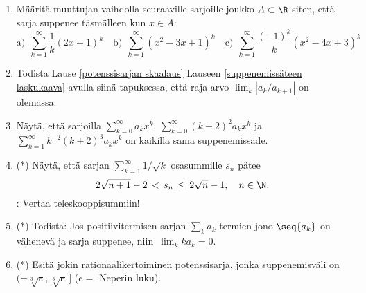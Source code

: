 \begin{enumerate}
\item
Määritä muuttujan vaihdolla seuraaville sarjoille joukko $A\subset\R$ siten, että sarja 
suppenee täsmälleen kun $x \in A$:
\[
\text{a)}\ \ \sum_{k=1}^\infty \frac{1}{k} (2x+1)^k \quad
\text{b)}\ \ \sum_{k=1}^\infty (x^2-3x+1)^k \quad 
\text{c)}\ \ \sum_{k=1}^\infty \frac{(-1)^k}{k}(x^2-4x+3)^k
\]

\item
Todista Lause \ref{potenssisarjan skaalaus} Lauseen \ref{suppenemissäteen laskukaava} avulla
siinä tapuksessa, että raja-arvo $\lim_k |a_k/a_{k+1}|$ on olemassa.

\item
Näytä, että sarjoilla $\sum_{k=0}^\infty a_k x^k$, $\sum_{k=0}^\infty (k-2)^2 a_k x^k$ ja 
$\sum_{k=1}^\infty k^{-2}(k+2)^3 a_k x^k$ on kaikilla sama suppenemissäde.

\item (*) \label{H-I-12: teleskooppiarvio}
Näytä, että sarjan $\sum_{k=1}^\infty 1/\sqrt{k}$ osasummille $s_n$ pätee
\[
2\sqrt{n+1}-2 \,<\, s_n \,\le\, 2\sqrt{n}-1, \quad n\in\N.
\]
: Vertaa teleskooppisummiin!

\item (*)
Todista: Jos positiivitermisen sarjan $\sum_k a_k$ termien jono $\seq{a_k}$ on vähenevä ja sarja
suppenee, niin $\,\lim_k ka_k=0$.

\item (*)
Esitä jokin rationaalikertoiminen potenssisarja, jonka suppenemisväli on 
$(-\sqrt[3]{e},\sqrt[3]{e}\,]$ ($e=$ Neperin luku).

\end{enumerate}